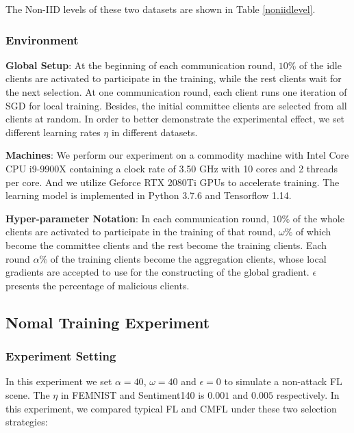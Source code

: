 \documentclass[10pt,journal,compsoc]{IEEEtran}
\begin{document}
The Non-IID levels of these two datasets are shown in Table \ref{noniidlevel}.

\subsubsection{Environment}


\hspace{1.0em} \textbf{Global Setup}: At the beginning of each communication round, $10\%$ of the idle clients are activated to participate in the training, while the rest clients wait for the next selection. At one communication round, each client runs one iteration of SGD for local training. Besides, the initial committee clients are selected from all clients at random. In order to better demonstrate the experimental effect, we set different learning rates $\eta$ in different datasets.


\textbf{Machines}: We perform our experiment on a commodity machine with Intel Core CPU i9-9900X containing a clock rate of 3.50 GHz with 10 cores and 2 threads per core. And we utilize Geforce RTX 2080Ti GPUs to accelerate training. The learning model is implemented in Python 3.7.6 and Tensorflow 1.14. 

\textbf{Hyper-parameter Notation}: In each communication round, $10\%$ of the whole clients are activated to participate in the training of that round, $\omega\%$ of which become the committee clients and the rest become the training clients. Each round $\alpha\%$ of the training clients become the aggregation clients, whose local gradients are accepted to use for the constructing of the global gradient. $\epsilon$ presents the percentage of malicious clients. 



\subsection{Nomal Training Experiment}\label{nomaltrainingexperiment}

\subsubsection{Experiment Setting}

In this experiment we set $\alpha = 40$, $\omega=40$ and $\epsilon=0$ to simulate a non-attack FL scene. The $\eta$ in FEMNIST and Sentiment140 is $0.001$ and $0.005$ respectively. In this experiment, we compared typical FL and CMFL under these two selection strategies:
\end{document}
